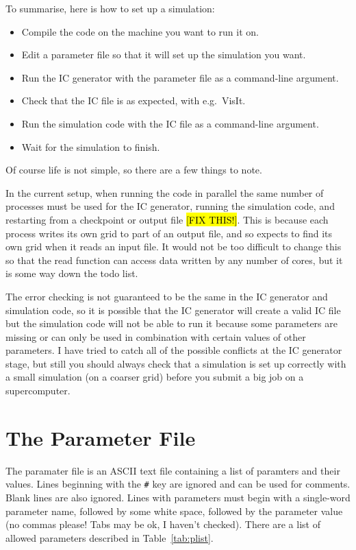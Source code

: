 \documentclass[a4paper,11pt]{report}
\begin{document}
To summarise, here is how to set up a simulation:
\begin{itemize}
\item Compile the code on the machine you want to run it on.
\item Edit a parameter file so that it will set up the simulation you want.
\item Run the IC generator with the parameter file as a command-line argument.
\item Check that the IC file is as expected, with e.g.\ VisIt.
\item Run the simulation code with the IC file as a command-line argument.
\item Wait for the simulation to finish.
\end{itemize}

Of course life is not simple, so there are a few things to note.

In the current setup, when running the code in parallel the same number of processes must be used for the IC generator, running the simulation code, and restarting from a checkpoint or output file \hl{[FIX THIS!]}.
This is because each process writes its own grid to part of an output file, and so expects to find its own grid when it reads an input file.
It would not be too difficult to change this so that the read function can access data written by any number of cores, but it is some way down the todo list.

The error checking is not guaranteed to be the same in the IC generator and simulation code, so it is possible that the IC generator will create a valid IC file but the simulation code will not be able to run it because some parameters are missing or can only be used in combination with certain values of other parameters.
I have tried to catch all of the possible conflicts at the IC generator stage, but still you should always check that a simulation is set up correctly with a small simulation (on a coarser grid) before you submit a big job on a supercomputer.


\section{The Parameter File}
The paramater file is an ASCII text file containing a list of paramters and their values.
Lines beginning with the \verb|#| key are ignored and can be used for comments.
Blank lines are also ignored.
Lines with parameters must begin with a single-word parameter name, followed by some white space, followed by the parameter value (no commas please! Tabs may be ok, I haven't checked).
There are a list of allowed parameters described in Table~\ref{tab:plist}.
\end{document}
